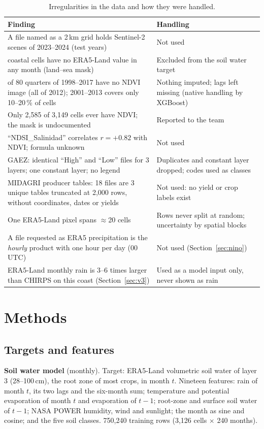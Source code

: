 \documentclass[11pt,a4paper]{article}
\begin{document}
\begin{table}[H]
\centering\small
\caption{Irregularities in the data and how they were handled.}
\label{tab:irreg}
\begin{tabularx}{\textwidth}{>{\raggedright\arraybackslash}p{5.4cm}X}
\toprule
Finding & Handling \\
\midrule
A file named as a 2\,km grid holds Sentinel-2 scenes of 2023--2024 (test years) & Not used \\
23 coastal cells have no ERA5-Land value in any month (land--sea mask) & Excluded from the soil water target \\
18 of 80 quarters of 1998--2017 have no NDVI image (all of 2012); 2001--2013 covers only 10--20\,\% of cells & Nothing imputed; lags left missing (native handling by XGBoost) \\
Only 2,585 of 3,149 cells ever have NDVI; the mask is undocumented & Reported to the team \\
``NDSI\_Salinidad'' correlates $r=+0.82$ with NDVI; formula unknown & Not used \\
GAEZ: identical ``High'' and ``Low'' files for 3 layers; one constant layer; no legend & Duplicates and constant layer dropped; codes used as classes \\
MIDAGRI producer tables: 18 files are 3 unique tables truncated at 2,000 rows, without coordinates, dates or yields & Not used: no yield or crop labels exist \\
One ERA5-Land pixel spans $\approx$20 cells & Rows never split at random; uncertainty by spatial blocks \\
A file requested as ERA5 precipitation is the \emph{hourly} product with one hour per day (00\,UTC) & Not used (Section~\ref{sec:nino}) \\
ERA5-Land monthly rain is 3--6 times larger than CHIRPS on this coast (Section~\ref{sec:v3}) & Used as a model input only, never shown as rain \\
\bottomrule
\end{tabularx}
\end{table}

\section{Methods}

\subsection{Targets and features}
\textbf{Soil water model} (monthly). Target: ERA5-Land volumetric soil water of layer 3 (28--100\,cm), the root zone of most
crops, in month $t$. Nineteen features: rain of month $t$, its two lags and the six-month sum; temperature and potential
evaporation of month $t$ and evaporation of $t-1$; root-zone and surface soil water of $t-1$; NASA POWER humidity, wind and
sunlight; the month as sine and cosine; and the five soil classes. 750,240 training rows (3,126 cells $\times$ 240 months).
\end{document}
